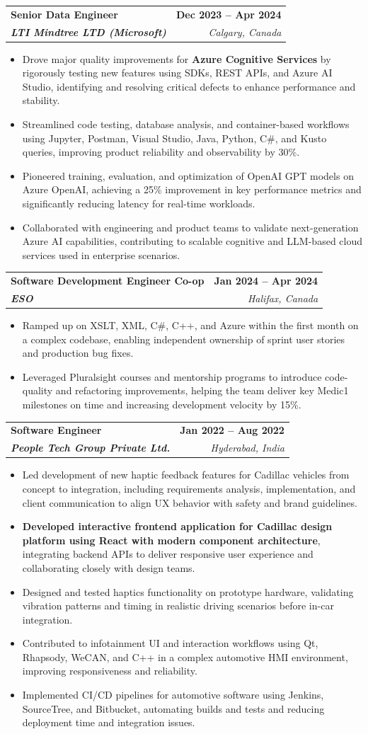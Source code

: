 \documentclass[letterpaper,11pt]{article}
\makeatletter
\newcommand{\resumeItem}[1]{
  \item\small{
    {#1 \vspace{-2pt}}
  }
}
\newcommand{\resumeSubheading}[4]{
  \vspace{-2pt}\item
    \begin{tabular*}{1.0\textwidth}[t]{l@{\extracolsep{\fill}}r}
      \textbf{#1} & \textbf{\small #2} \\
      \textit{\small#3} & \textit{\small #4} \\
    \end{tabular*}\vspace{-7pt}
}
\newcommand{\resumeItemListStart}{\begin{itemize}}
\newcommand{\resumeItemListEnd}{\end{itemize}\vspace{-5pt}}
\makeatother
\begin{document}
    \resumeSubheading
      {\textbf{Senior Data Engineer}}{\textbf{Dec 2023 -- Apr 2024}}
      {\textbf{LTI Mindtree LTD (Microsoft)}}{Calgary, Canada}
      \resumeItemListStart
        \resumeItem{Drove major quality improvements for \textbf{Azure Cognitive Services} by rigorously testing new features using SDKs, REST APIs, and Azure AI Studio, identifying and resolving critical defects to enhance performance and stability.}
        \resumeItem{Streamlined code testing, database analysis, and container-based workflows using Jupyter, Postman, Visual Studio, Java, Python, C\#, and Kusto queries, improving product reliability and observability by 30\%.}
        \resumeItem{Pioneered training, evaluation, and optimization of OpenAI GPT models on Azure OpenAI, achieving a 25\% improvement in key performance metrics and significantly reducing latency for real-time workloads.}
        \resumeItem{Collaborated with engineering and product teams to validate next-generation Azure AI capabilities, contributing to scalable cognitive and LLM-based cloud services used in enterprise scenarios.}
      \resumeItemListEnd
    
    \resumeSubheading
      {\textbf{Software Development Engineer Co-op}}{\textbf{Jan 2024 -- Apr 2024}}
      {\textbf{ESO}}{Halifax, Canada}
      \resumeItemListStart
        \resumeItem{Ramped up on XSLT, XML, C\#, C++, and Azure within the first month on a complex codebase, enabling independent ownership of sprint user stories and production bug fixes.}
        \resumeItem{Leveraged Pluralsight courses and mentorship programs to introduce code-quality and refactoring improvements, helping the team deliver key Medic1 milestones on time and increasing development velocity by 15\%.}
      \resumeItemListEnd

    \resumeSubheading
      {\textbf{Software Engineer}}{\textbf{Jan 2022 -- Aug 2022}}
      {\textbf{People Tech Group Private Ltd.}}{Hyderabad, India}
      \resumeItemListStart
        \resumeItem{Led development of new haptic feedback features for Cadillac vehicles from concept to integration, including requirements analysis, implementation, and client communication to align UX behavior with safety and brand guidelines.}
        \resumeItem{\textbf{Developed interactive frontend application for Cadillac design platform using React with modern component architecture}, integrating backend APIs to deliver responsive user experience and collaborating closely with design teams.}
        \resumeItem{Designed and tested haptics functionality on prototype hardware, validating vibration patterns and timing in realistic driving scenarios before in-car integration.}
        \resumeItem{Contributed to infotainment UI and interaction workflows using Qt, Rhapsody, WeCAN, and C++ in a complex automotive HMI environment, improving responsiveness and reliability.}
        \resumeItem{Implemented CI/CD pipelines for automotive software using Jenkins, SourceTree, and Bitbucket, automating builds and tests and reducing deployment time and integration issues.}
      \resumeItemListEnd
\end{document}
